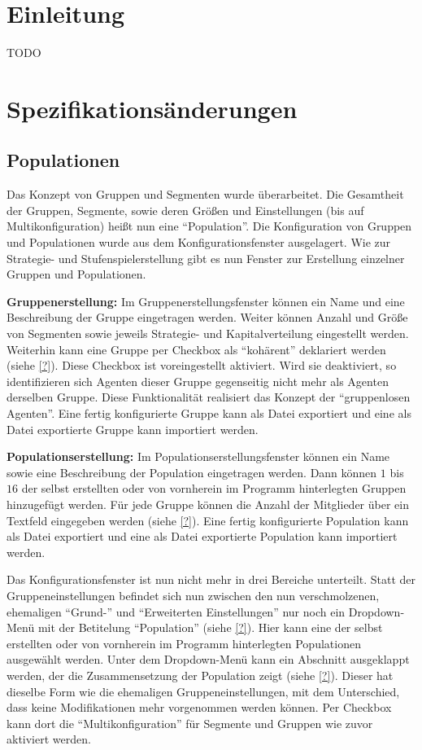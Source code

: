 \documentclass[parskip=full,11pt]{scrartcl}
\begin{document}
\section{Einleitung}
TODO

\section{Spezifikationsänderungen}

\subsection{Populationen}
Das Konzept von Gruppen und Segmenten wurde überarbeitet. Die Gesamtheit der Gruppen, Segmente, sowie deren Größen und Einstellungen (bis auf Multikonfiguration) heißt nun eine \enquote{Population}. Die Konfiguration von Gruppen und Populationen wurde aus dem Konfigurationsfenster ausgelagert. Wie zur Strategie- und Stufenspielerstellung gibt es nun Fenster zur Erstellung einzelner Gruppen und Populationen.

\textbf{Gruppenerstellung:}
Im Gruppenerstellungsfenster können ein Name und eine Beschreibung der Gruppe eingetragen werden. Weiter können Anzahl und Größe von Segmenten sowie jeweils Strategie- und Kapitalverteilung eingestellt werden. Weiterhin kann eine Gruppe per Checkbox als \enquote{kohärent} deklariert werden (siehe \cref{?}). Diese Checkbox ist voreingestellt aktiviert. Wird sie deaktiviert, so identifizieren sich Agenten dieser Gruppe gegenseitig nicht mehr als Agenten derselben Gruppe. Diese Funktionalität realisiert das Konzept der \enquote{gruppenlosen Agenten}. Eine fertig konfigurierte Gruppe kann als Datei exportiert und eine als Datei exportierte Gruppe kann importiert werden.

\textbf{Populationserstellung:}
Im Populationserstellungsfenster können ein Name sowie eine Beschreibung der Population eingetragen werden. Dann können \(1\) bis \(16\) der selbst erstellten oder von vornherein im Programm hinterlegten Gruppen hinzugefügt werden. Für jede Gruppe können die Anzahl der Mitglieder über ein Textfeld eingegeben werden (siehe \cref{?}). Eine fertig konfigurierte Population kann als Datei exportiert und eine als Datei exportierte Population kann importiert werden.

Das Konfigurationsfenster ist nun nicht mehr in drei Bereiche unterteilt. Statt der Gruppeneinstellungen befindet sich nun zwischen den nun verschmolzenen, ehemaligen \enquote{Grund-} und \enquote{Erweiterten Einstellungen} nur noch ein Dropdown-Menü mit der Betitelung \enquote{Population} (siehe \cref{?}). Hier kann eine der selbst erstellten oder von vornherein im Programm hinterlegten Populationen ausgewählt werden. Unter dem Dropdown-Menü kann ein Abschnitt ausgeklappt werden, der die Zusammensetzung der Population zeigt (siehe \cref{?}). Dieser hat dieselbe Form wie die ehemaligen Gruppeneinstellungen, mit dem Unterschied, dass keine Modifikationen mehr vorgenommen werden können. Per Checkbox kann dort die \enquote{Multikonfiguration} für Segmente und Gruppen wie zuvor aktiviert werden.
\end{document}
